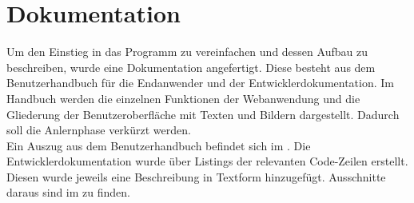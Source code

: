 \section{Dokumentation}
\label{sec:Dokumentation}
Um den Einstieg in das Programm zu vereinfachen und dessen Aufbau zu beschreiben,
wurde eine Dokumentation angefertigt. Diese besteht aus dem Benutzerhandbuch für
die Endanwender und der Entwicklerdokumentation. Im Handbuch werden die einzelnen
Funktionen der Webanwendung und die Gliederung der Benutzeroberfläche mit Texten
und Bildern dargestellt. Dadurch soll die Anlernphase verkürzt werden.\\
Ein Auszug aus dem Benutzerhandbuch befindet sich im .
Die Entwicklerdokumentation wurde über Listings der relevanten Code-Zeilen erstellt.
Diesen wurde jeweils eine Beschreibung in Textform hinzugefügt. Ausschnitte daraus 
sind im  zu finden.

